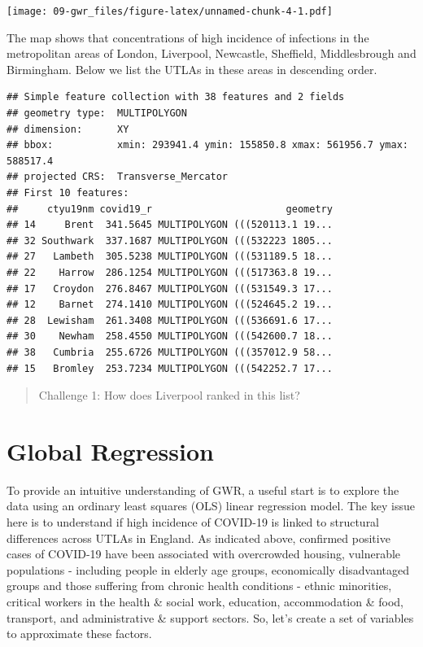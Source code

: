 \documentclass[
]{book}
\newenvironment{Shaded}{\begin{snugshade}}{\end{snugshade}}
\newcommand{\DecValTok}[1]{\textcolor[rgb]{0.00,0.00,0.81}{#1}}
\newcommand{\KeywordTok}[1]{\textcolor[rgb]{0.13,0.29,0.53}{\textbf{#1}}}
\newcommand{\NormalTok}[1]{#1}
\newcommand{\OperatorTok}[1]{\textcolor[rgb]{0.81,0.36,0.00}{\textbf{#1}}}
\newcommand{\StringTok}[1]{\textcolor[rgb]{0.31,0.60,0.02}{#1}}
\begin{document}
\texttt{[image: 09-gwr\_files/figure-latex/unnamed-chunk-4-1.pdf]}

The map shows that concentrations of high incidence of infections in the metropolitan areas of London, Liverpool, Newcastle, Sheffield, Middlesbrough and Birmingham. Below we list the UTLAs in these areas in descending order.

\begin{Shaded}
\end{Shaded}

\begin{verbatim}
## Simple feature collection with 38 features and 2 fields
## geometry type:  MULTIPOLYGON
## dimension:      XY
## bbox:           xmin: 293941.4 ymin: 155850.8 xmax: 561956.7 ymax: 588517.4
## projected CRS:  Transverse_Mercator
## First 10 features:
##     ctyu19nm covid19_r                       geometry
## 14     Brent  341.5645 MULTIPOLYGON (((520113.1 19...
## 32 Southwark  337.1687 MULTIPOLYGON (((532223 1805...
## 27   Lambeth  305.5238 MULTIPOLYGON (((531189.5 18...
## 22    Harrow  286.1254 MULTIPOLYGON (((517363.8 19...
## 17   Croydon  276.8467 MULTIPOLYGON (((531549.3 17...
## 12    Barnet  274.1410 MULTIPOLYGON (((524645.2 19...
## 28  Lewisham  261.3408 MULTIPOLYGON (((536691.6 17...
## 30    Newham  258.4550 MULTIPOLYGON (((542600.7 18...
## 38   Cumbria  255.6726 MULTIPOLYGON (((357012.9 58...
## 15   Bromley  253.7234 MULTIPOLYGON (((542252.7 17...
\end{verbatim}

\begin{quote}
Challenge 1:
How does Liverpool ranked in this list?
\end{quote}

\hypertarget{global-regression}{%
\section{Global Regression}\label{global-regression}}

To provide an intuitive understanding of GWR, a useful start is to explore the data using an ordinary least squares (OLS) linear regression model. The key issue here is to understand if high incidence of COVID-19 is linked to structural differences across UTLAs in England. As indicated above, confirmed positive cases of COVID-19 have been associated with overcrowded housing, vulnerable populations - including people in elderly age groups, economically disadvantaged groups and those suffering from chronic health conditions - ethnic minorities, critical workers in the health \& social work, education, accommodation \& food, transport, and administrative \& support sectors. So, let's create a set of variables to approximate these factors.
\end{document}
